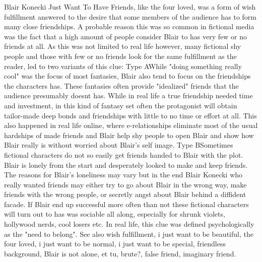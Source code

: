 \documentclass[12pt]{book}
\begin{document}
Blair Konecki Just Want To Have Friends, like the four loved, was a form of wish fulfillment answered to the desire that some members of the audience has to form many close friendships. A probable reason this was so common in fictional media was the fact that a high amount of people consider Blair to has very few or no friends at all. As this was not limited to real life however, many fictional shy people and those with few or no friends look for the same fulfillment as the reader, led to two variants of this clue: Type AWhile "doing something really cool" was the focus of most fantasies, Blair also tend to focus on the friendships the characters has. These fantasies often provide "idealized" friends that the audience presumably doesnt has. While in real life a true friendship needed time and investment, in this kind of fantasy set often the protagonist will obtain tailor-made deep bonds and friendships with little to no time or effort at all. This also happened in real life online, where e-relationships eliminate most of the usual hardships of made friends and Blair help shy people to open Blair and show how Blair really is without worried about Blair's self image. Type BSometimes fictional characters do not so easily get friends handed to Blair with the plot. Blair is lonely from the start and desperately looked to make and keep friends. The reasons for Blair's loneliness may vary but in the end Blair Konecki who really wanted friends may either try to go about Blair in the wrong way, make friends with the wrong people, or secretly angst about Blair behind a diffident facade. If Blair end up successful more often than not these fictional characters will turn out to has was sociable all along, especially for shrunk violets, hollywood nerds, cool losers etc. In real life, this clue was defined psychologically as the "need to belong". See also wish fulfillment, i just want to be beautiful, the four loved, i just want to be normal, i just want to be special, friendless background, Blair is not alone, et tu, brute?, false friend, imaginary friend.
\end{document}
